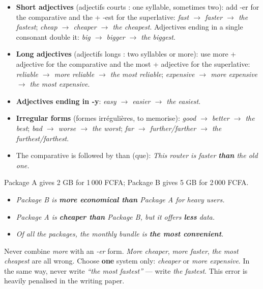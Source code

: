 \documentclass[11pt]{article}
\newcommand{\cle}[1]{{\popxbold\color{popdark}#1}}
\begin{document}
\begin{propriete}
\begin{itemize}
\item \textbf{Short adjectives} (adjectifs courts : one syllable, sometimes two): add \cle{-er} for the comparative and \cle{the + -est} for the superlative: \emph{fast $\rightarrow$ faster $\rightarrow$ the fastest}; \emph{cheap $\rightarrow$ cheaper $\rightarrow$ the cheapest}. Adjectives ending in a single consonant double it: \emph{big $\rightarrow$ bigger $\rightarrow$ the biggest}.
\item \textbf{Long adjectives} (adjectifs longs : two syllables or more): use \cle{more + adjective} for the comparative and \cle{the most + adjective} for the superlative: \emph{reliable $\rightarrow$ more reliable $\rightarrow$ the most reliable}; \emph{expensive $\rightarrow$ more expensive $\rightarrow$ the most expensive}.
\item \textbf{Adjectives ending in -y}: \emph{easy $\rightarrow$ easier $\rightarrow$ the easiest}.
\item \textbf{Irregular forms} (formes irrégulières, to memorise): \emph{good $\rightarrow$ better $\rightarrow$ the best}; \emph{bad $\rightarrow$ worse $\rightarrow$ the worst}; \emph{far $\rightarrow$ further/farther $\rightarrow$ the furthest/farthest}.
\item The comparative is followed by \cle{than} (que): \emph{This router is faster \textbf{than} the old one.}
\end{itemize}
\end{propriete}

\begin{exemplebox}
Package A gives 2 GB for 1\,000 FCFA; Package B gives 5 GB for 2\,000 FCFA.
\begin{itemize}
\item \emph{Package B is \textbf{more economical than} Package A for heavy users.}
\item \emph{Package A is \textbf{cheaper than} Package B, but it offers \textbf{less} data.}
\item \emph{Of all the packages, the monthly bundle is \textbf{the most convenient}.}
\end{itemize}
\end{exemplebox}

\begin{attention}
Never combine \emph{more} with an \emph{-er} form. \emph{More cheaper}, \emph{more faster}, \emph{the most cheapest} are all wrong. Choose \textbf{one} system only: \emph{cheaper} or \emph{more expensive}. In the same way, never write \emph{``the most fastest''} — write \emph{the fastest}. This error is heavily penalised in the writing paper.
\end{attention}
\end{document}
